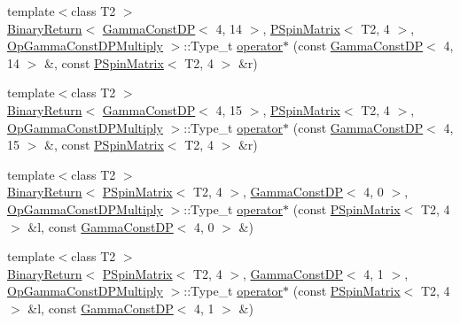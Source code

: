 \begin{DoxyCompactItemize}
\item 
{\footnotesize template$<$class T2 $>$ }\\\mbox{\hyperlink{structENSEM_1_1BinaryReturn}{Binary\+Return}}$<$ \mbox{\hyperlink{classENSEM_1_1GammaConstDP}{Gamma\+Const\+DP}}$<$ 4, 14 $>$, \mbox{\hyperlink{classENSEM_1_1PSpinMatrix}{P\+Spin\+Matrix}}$<$ T2, 4 $>$, \mbox{\hyperlink{structENSEM_1_1OpGammaConstDPMultiply}{Op\+Gamma\+Const\+D\+P\+Multiply}} $>$\+::Type\+\_\+t \mbox{\hyperlink{group__primspinmatrix_ga3572342590fe6c5683d22d857b757675}{operator$\ast$}} (const \mbox{\hyperlink{classENSEM_1_1GammaConstDP}{Gamma\+Const\+DP}}$<$ 4, 14 $>$ \&, const \mbox{\hyperlink{classENSEM_1_1PSpinMatrix}{P\+Spin\+Matrix}}$<$ T2, 4 $>$ \&r)
\item 
{\footnotesize template$<$class T2 $>$ }\\\mbox{\hyperlink{structENSEM_1_1BinaryReturn}{Binary\+Return}}$<$ \mbox{\hyperlink{classENSEM_1_1GammaConstDP}{Gamma\+Const\+DP}}$<$ 4, 15 $>$, \mbox{\hyperlink{classENSEM_1_1PSpinMatrix}{P\+Spin\+Matrix}}$<$ T2, 4 $>$, \mbox{\hyperlink{structENSEM_1_1OpGammaConstDPMultiply}{Op\+Gamma\+Const\+D\+P\+Multiply}} $>$\+::Type\+\_\+t \mbox{\hyperlink{group__primspinmatrix_gafeff9dceaf056bcf56866006862373d8}{operator$\ast$}} (const \mbox{\hyperlink{classENSEM_1_1GammaConstDP}{Gamma\+Const\+DP}}$<$ 4, 15 $>$ \&, const \mbox{\hyperlink{classENSEM_1_1PSpinMatrix}{P\+Spin\+Matrix}}$<$ T2, 4 $>$ \&r)
\item 
{\footnotesize template$<$class T2 $>$ }\\\mbox{\hyperlink{structENSEM_1_1BinaryReturn}{Binary\+Return}}$<$ \mbox{\hyperlink{classENSEM_1_1PSpinMatrix}{P\+Spin\+Matrix}}$<$ T2, 4 $>$, \mbox{\hyperlink{classENSEM_1_1GammaConstDP}{Gamma\+Const\+DP}}$<$ 4, 0 $>$, \mbox{\hyperlink{structENSEM_1_1OpGammaConstDPMultiply}{Op\+Gamma\+Const\+D\+P\+Multiply}} $>$\+::Type\+\_\+t \mbox{\hyperlink{group__primspinmatrix_ga922c6c72866d31038a56946930310c35}{operator$\ast$}} (const \mbox{\hyperlink{classENSEM_1_1PSpinMatrix}{P\+Spin\+Matrix}}$<$ T2, 4 $>$ \&l, const \mbox{\hyperlink{classENSEM_1_1GammaConstDP}{Gamma\+Const\+DP}}$<$ 4, 0 $>$ \&)
\item 
{\footnotesize template$<$class T2 $>$ }\\\mbox{\hyperlink{structENSEM_1_1BinaryReturn}{Binary\+Return}}$<$ \mbox{\hyperlink{classENSEM_1_1PSpinMatrix}{P\+Spin\+Matrix}}$<$ T2, 4 $>$, \mbox{\hyperlink{classENSEM_1_1GammaConstDP}{Gamma\+Const\+DP}}$<$ 4, 1 $>$, \mbox{\hyperlink{structENSEM_1_1OpGammaConstDPMultiply}{Op\+Gamma\+Const\+D\+P\+Multiply}} $>$\+::Type\+\_\+t \mbox{\hyperlink{group__primspinmatrix_gae75fd887b0fbf22c05f8739b68d7428c}{operator$\ast$}} (const \mbox{\hyperlink{classENSEM_1_1PSpinMatrix}{P\+Spin\+Matrix}}$<$ T2, 4 $>$ \&l, const \mbox{\hyperlink{classENSEM_1_1GammaConstDP}{Gamma\+Const\+DP}}$<$ 4, 1 $>$ \&)

\end{DoxyCompactItemize}
